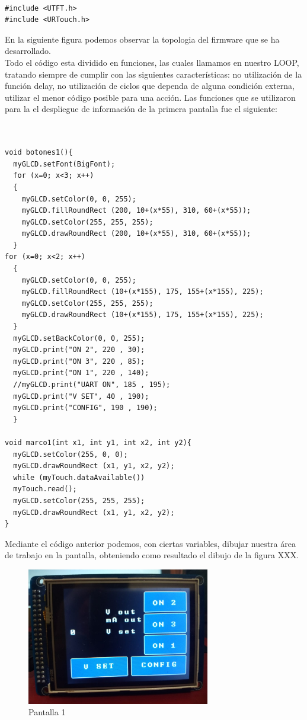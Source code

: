 \begin{verbatim}

#include <UTFT.h>
#include <URTouch.h>

\end{verbatim}

En la siguiente figura podemos observar la topologia del firmware que se ha desarrollado.\\

Todo el código esta dividido en funciones, las cuales llamamos en nuestro LOOP, tratando siempre de cumplir con las siguientes características: no utilización de la función delay, no utilización de ciclos que dependa de alguna condición externa, utilizar el menor código posible para una acción. Las funciones que se utilizaron para la el despliegue de información de la primera pantalla fue el siguiente:


\begin{verbatim}

 
void botones1(){ 
  myGLCD.setFont(BigFont); 
  for (x=0; x<3; x++)
  {
    myGLCD.setColor(0, 0, 255);
    myGLCD.fillRoundRect (200, 10+(x*55), 310, 60+(x*55));
    myGLCD.setColor(255, 255, 255);
    myGLCD.drawRoundRect (200, 10+(x*55), 310, 60+(x*55));
  }
for (x=0; x<2; x++)
  {
    myGLCD.setColor(0, 0, 255);
    myGLCD.fillRoundRect (10+(x*155), 175, 155+(x*155), 225);
    myGLCD.setColor(255, 255, 255);
    myGLCD.drawRoundRect (10+(x*155), 175, 155+(x*155), 225);
  }
  myGLCD.setBackColor(0, 0, 255);
  myGLCD.print("ON 2", 220 , 30);
  myGLCD.print("ON 3", 220 , 85);
  myGLCD.print("ON 1", 220 , 140);
  //myGLCD.print("UART ON", 185 , 195);
  myGLCD.print("V SET", 40 , 190);
  myGLCD.print("CONFIG", 190 , 190);
  }
  
void marco1(int x1, int y1, int x2, int y2){ 
  myGLCD.setColor(255, 0, 0);
  myGLCD.drawRoundRect (x1, y1, x2, y2);
  while (myTouch.dataAvailable())
  myTouch.read();
  myGLCD.setColor(255, 255, 255);
  myGLCD.drawRoundRect (x1, y1, x2, y2);
}
\end{verbatim}

Mediante el código anterior podemos, con ciertas variables, dibujar nuestra área de trabajo en la pantalla, obteniendo como resultado el dibujo de la figura XXX.

\begin{figure}[H]
\centering
\includegraphics[width=8cm]{Capitulo3/figs/pantalla1.jpg}
\caption{Pantalla 1}
\end{figure}

